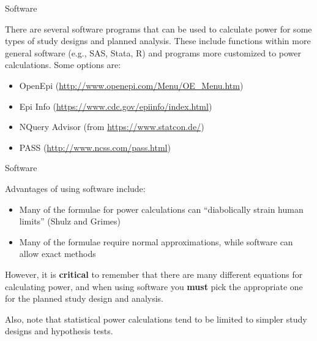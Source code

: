 \documentclass[ignorenonframetext,]{beamer}
\providecommand{\tightlist}{%
  \setlength{\itemsep}{0pt}\setlength{\parskip}{0pt}}
\begin{document}
\begin{frame}{Software}

There are several software programs that can be used to calculate power
for some types of study designs and planned analysis. These include
functions within more general software (e.g., SAS, Stata, R) and
programs more customized to power calculations. Some options are:

\begin{itemize}
\tightlist
\item
  OpenEpi (\url{http://www.openepi.com/Menu/OE_Menu.htm})
\item
  Epi Info (\url{https://www.cdc.gov/epiinfo/index.html})
\item
  NQuery Advisor (from \url{https://www.statcon.de/})
\item
  PASS (\url{http://www.ncss.com/pass.html})
\end{itemize}

\end{frame}

\begin{frame}{Software}

Advantages of using software include:

\begin{itemize}
\tightlist
\item
  Many of the formulae for power calculations can ``diabolically strain
  human limits'' (Shulz and Grimes)
\item
  Many of the formulae require normal approximations, while software can
  allow exact methods
\end{itemize}

However, it is \textbf{critical} to remember that there are many
different equations for calculating power, and when using software you
\textbf{must} pick the appropriate one for the planned study design and
analysis.

Also, note that statistical power calculations tend to be limited to
simpler study designs and hypothesis tests.

\end{frame}
\end{document}

